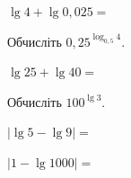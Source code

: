 \documentclass[12pt]{article}
\begin{document}
\begin{samepage}
\noindent\zadnum $\lg 4 + \lg 0{,}025 = $ \par
\nopagebreak\nbvspace{0.3cm}

\nmtnobreak
{}
\par{}
\end{samepage}

\begin{samepage}
\noindent\zadnum Обчисліть $0{,}25^{\log_{0,5} 4}$. \par
\nopagebreak\nbvspace{0.3cm}

\nmtnobreak
{}
\par{}
\end{samepage}

\begin{samepage}
\noindent\zadnum $\lg 25 + \lg 40 = $ \par
\nopagebreak\nbvspace{0.3cm}

\nmtnobreak
{}
\par{}
\end{samepage}

\begin{samepage}
\noindent\zadnum Обчисліть $100^{\lg 3}$. \par
\nopagebreak\nbvspace{0.3cm}

\nmtnobreak
{}
\par{}
\end{samepage}

\begin{samepage}
\noindent\zadnum $|\lg 5 - \lg 9| = $ \par
\nopagebreak\nbvspace{0.3cm}

\nmtnobreak
{}
\par{}
\end{samepage}

\begin{samepage}
\noindent\zadnum $|1 - \lg 1000| = $ \par
\nopagebreak\nbvspace{0.3cm}

\nmtnobreak
{}

\nmtnobreak
\par{}\vspace{0.25cm}
\end{samepage}
\end{document}
